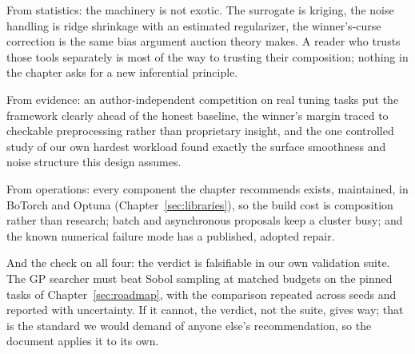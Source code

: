 From statistics: the machinery is not exotic. The surrogate is
kriging, the noise handling is ridge shrinkage with an estimated
regularizer, the winner's-curse correction is the same bias argument
auction theory makes. A reader who trusts those tools separately is
most of the way to trusting their composition; nothing in the chapter
asks for a new inferential principle.

From evidence: an author-independent competition on real tuning tasks
put the framework clearly ahead of the honest baseline, the winner's
margin traced to checkable preprocessing rather than proprietary
insight, and the one controlled study of our own hardest workload
found exactly the surface smoothness and noise structure this design
assumes.

From operations: every component the chapter recommends exists,
maintained, in BoTorch and Optuna (Chapter~\ref{sec:libraries}), so
the build cost is composition rather than research; batch and
asynchronous proposals keep a cluster busy; and the known numerical
failure mode has a published, adopted repair.

And the check on all four: the verdict is falsifiable in our own
validation suite. The GP searcher must beat Sobol sampling at matched
budgets on the pinned tasks of Chapter~\ref{sec:roadmap}, with the
comparison repeated across seeds and reported with uncertainty. If it
cannot, the verdict, not the suite, gives way; that is the standard we
would demand of anyone else's recommendation, so the document applies
it to its own.

